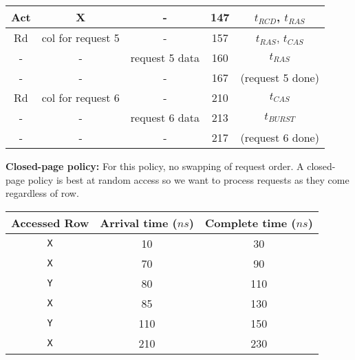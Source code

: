 \documentclass[a4paper, 11pt]{exam}
\begin{document}
\begin{enumerate}
\begin{center}
\begin{tabular}{|c|c|c|c|c|}
		\hline
		Act & X & - & 147 & $t_{RCD}$, $t_{RAS}$ \\
		\hline
		Rd & col for request 5 & - & 157 & $t_{RAS}$, $t_{CAS}$ \\
		\hline
		- & - & request 5 data & 160 & $t_{RAS}$ \\
		\hline
		- & - & - & 167 & (request 5 done) \\
		\hline
		Rd & col for request 6 & - & 210 & $t_{CAS}$ \\
		\hline
		- & - & request 6 data & 213 & $t_{BURST}$ \\
		\hline
		- & - & - & 217 & (request 6 done) \\
		\hline
	\end{tabular}
\end{center}

\textbf{Closed-page policy:} For this policy, no swapping of request order. A closed-page policy is best at random access so we want to process requests as they come regardless of row.

\begin{center}
	\begin{tabular}{|c|c|c|}
		\hline
		\textbf{Accessed Row} & \textbf{Arrival time ($ns$)} & \textbf{Complete time ($ns$)} \\
		\hline
		\texttt{X}  & 10 & 30\\
		\hline
		\texttt{X}  & 70 & 90\\
		\hline
		\texttt{Y}  & 80 & 110\\
		\hline
		\texttt{X}  & 85 & 130\\
		\hline
		\texttt{Y}  & 110 & 150\\
		\hline
		\texttt{X} & 210 & 230\\
		\hline
	\end{tabular}
\end{center}


\end{enumerate}
\end{document}
